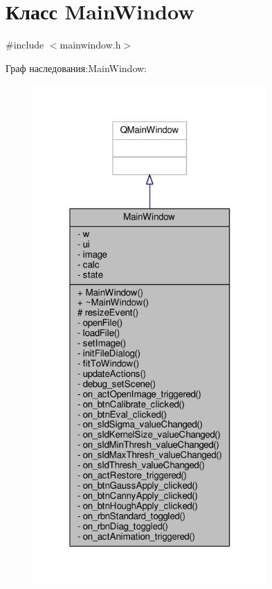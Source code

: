 \hypertarget{class_main_window}{}\section{Класс Main\+Window}
\label{class_main_window}


{\ttfamily \#include $<$mainwindow.\+h$>$}



Граф наследования\+:Main\+Window\+:
\nopagebreak
\begin{figure}[H]
\begin{center}
\leavevmode
\includegraphics[width=253pt]{de/d4b/class_main_window__inherit__graph}
\end{center}
\end{figure}


